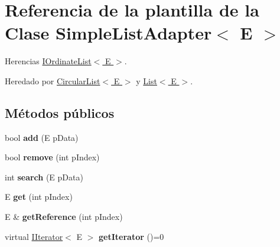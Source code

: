 \hypertarget{classSimpleListAdapter}{\section{Referencia de la plantilla de la Clase Simple\-List\-Adapter$<$ E $>$}
\label{classSimpleListAdapter}
}


Herencias \hyperlink{classIOrdinateList}{I\-Ordinate\-List$<$ E $>$}.



Heredado por \hyperlink{classCircularList}{Circular\-List$<$ E $>$} y \hyperlink{classList}{List$<$ E $>$}.

\subsection*{Métodos públicos}
\begin{DoxyCompactItemize}
\item 
\hypertarget{classSimpleListAdapter_a659e4b834a3d5dc46e25665c7809a3d8}{bool {\bfseries add} (E p\-Data)}\label{classSimpleListAdapter_a659e4b834a3d5dc46e25665c7809a3d8}

\item 
\hypertarget{classSimpleListAdapter_a459ccf5fdce99a9b6dade7d187fb2e8d}{bool {\bfseries remove} (int p\-Index)}\label{classSimpleListAdapter_a459ccf5fdce99a9b6dade7d187fb2e8d}

\item 
\hypertarget{classSimpleListAdapter_a87e630769601af784a67ac90146e730b}{int {\bfseries search} (E p\-Data)}\label{classSimpleListAdapter_a87e630769601af784a67ac90146e730b}

\item 
\hypertarget{classSimpleListAdapter_a0dd35a961e4c7311cb82c11782340667}{E {\bfseries get} (int p\-Index)}\label{classSimpleListAdapter_a0dd35a961e4c7311cb82c11782340667}

\item 
\hypertarget{classSimpleListAdapter_aa548a9578aa7288205982062834e00e9}{E \& {\bfseries get\-Reference} (int p\-Index)}\label{classSimpleListAdapter_aa548a9578aa7288205982062834e00e9}

\item 
\hypertarget{classSimpleListAdapter_a07ae6a3e7211ca92ffdb60bbc742763e}{virtual \hyperlink{classIIterator}{I\-Iterator}$<$ E $>$ {\bfseries get\-Iterator} ()=0}\label{classSimpleListAdapter_a07ae6a3e7211ca92ffdb60bbc742763e}

\end{DoxyCompactItemize}
